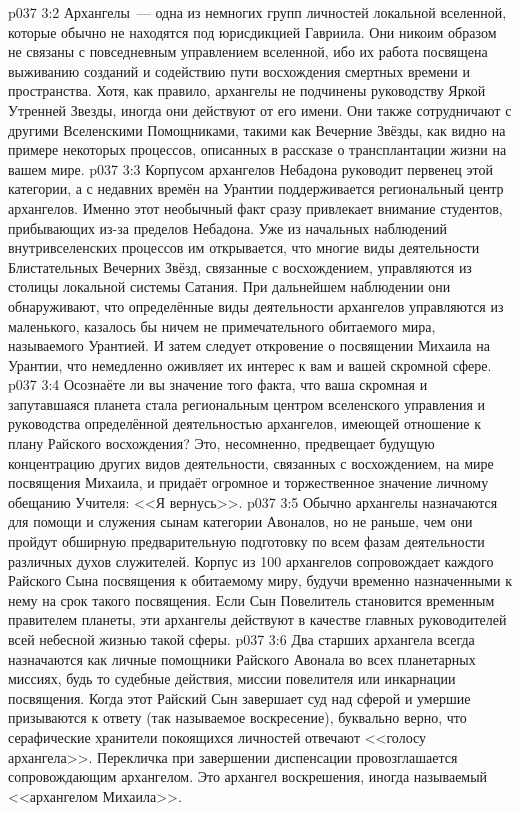 \vs p037 3:2 Архангелы~--- одна из немногих групп личностей локальной вселенной, которые обычно не находятся под юрисдикцией Гавриила. Они никоим образом не связаны с повседневным управлением вселенной, ибо их работа посвящена выживанию созданий и содействию пути восхождения смертных времени и пространства. Хотя, как правило, архангелы не подчинены руководству Яркой Утренней Звезды, иногда они действуют от его имени. Они также сотрудничают с другими Вселенскими Помощниками, такими как Вечерние Звёзды, как видно на примере некоторых процессов, описанных в рассказе о трансплантации жизни на вашем мире.
\vs p037 3:3 \pc Корпусом архангелов Небадона руководит первенец этой категории, а с недавних времён на Урантии поддерживается региональный центр архангелов. Именно этот необычный факт сразу привлекает внимание студентов, прибывающих из-за пределов Небадона. Уже из начальных наблюдений внутривселенских процессов им открывается, что многие виды деятельности Блистательных Вечерних Звёзд, связанные с восхождением, управляются из столицы локальной системы Сатания. При дальнейшем наблюдении они обнаруживают, что определённые виды деятельности архангелов управляются из маленького, казалось бы ничем не примечательного обитаемого мира, называемого Урантией. И затем следует откровение о посвящении Михаила на Урантии, что немедленно оживляет их интерес к вам и вашей скромной сфере.
\vs p037 3:4 Осознаёте ли вы значение того факта, что ваша скромная и запутавшаяся планета стала региональным центром вселенского управления и руководства определённой деятельностью архангелов, имеющей отношение к плану Райского восхождения? Это, несомненно, предвещает будущую концентрацию других видов деятельности, связанных с восхождением, на мире посвящения Михаила, и придаёт огромное и торжественное значение личному обещанию Учителя: <<Я вернусь>>.
\vs p037 3:5 \pc Обычно архангелы назначаются для помощи и служения сынам категории Авоналов, но не раньше, чем они пройдут обширную предварительную подготовку по всем фазам деятельности различных духов служителей. Корпус из 100 архангелов сопровождает каждого Райского Сына посвящения к обитаемому миру, будучи временно назначенными к нему на срок такого посвящения. Если Сын Повелитель становится временным правителем планеты, эти архангелы действуют в качестве главных руководителей всей небесной жизнью такой сферы.
\vs p037 3:6 Два старших архангела всегда назначаются как личные помощники Райского Авонала во всех планетарных миссиях, будь то судебные действия, миссии повелителя или инкарнации посвящения. Когда этот Райский Сын завершает суд над сферой и умершие призываются к ответу (так называемое воскресение), буквально верно, что серафические хранители покоящихся личностей отвечают <<голосу архангела>>. Перекличка при завершении диспенсации провозглашается сопровождающим архангелом. Это архангел воскрешения, иногда называемый <<архангелом Михаила>>.

